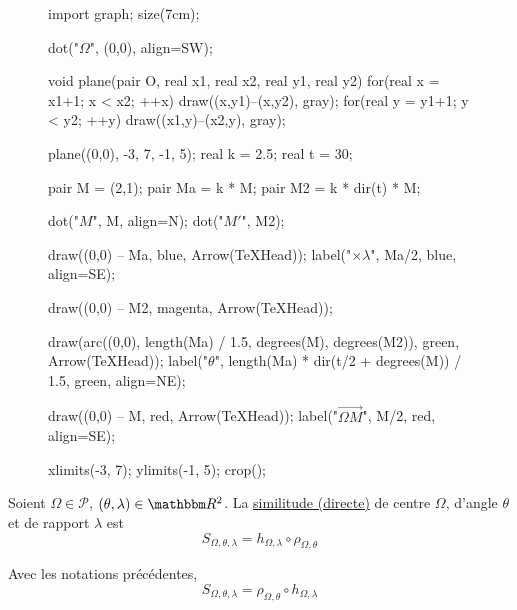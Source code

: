 \begin{defn}
	\begin{minipage}
		{\linewidth}
		\begin{wrapfigure}[10]{r}
			{0.5\linewidth}
			\centering
			\begin{asy}
				import graph;
				size(7cm);

				dot("$\Omega$", (0,0), align=SW);

				void plane(pair O, real x1, real x2, real y1, real y2) {
					for(real x = x1+1; x < x2; ++x) draw((x,y1)--(x,y2), gray);
					for(real y = y1+1; y < y2; ++y) draw((x1,y)--(x2,y), gray);
				}

				plane((0,0), -3, 7, -1, 5);
				real k = 2.5;
				real t = 30;

				pair M = (2,1);
				pair Ma = k * M;
				pair M2 = k * dir(t) * M;

				dot("$M$", M, align=N);
				dot("$M'$", M2);

				draw((0,0) -- Ma, blue, Arrow(TeXHead));
				label("$\times\lambda$", Ma/2, blue, align=SE);

				draw((0,0) -- M2, magenta, Arrow(TeXHead));

				draw(arc((0,0), length(Ma) / 1.5, degrees(M), degrees(M2)), green, Arrow(TeXHead));
				label("$\theta$", length(Ma) * dir(t/2 + degrees(M)) / 1.5, green, align=NE);

				draw((0,0) -- M, red, Arrow(TeXHead));
				label("$\vec{\Omega M}$", M/2, red, align=SE);

				xlimits(-3, 7);
				ylimits(-1, 5);
				crop();
			\end{asy}
		\end{wrapfigure}

		Soient $\Omega\in \mathcal{P}$, $(\theta,\lambda)\in \R^2$.
		La \underline{similitude (directe)} de centre $\Omega$, d'angle $\theta$ et de rapport $\lambda$ est \[
			S_{\Omega,\theta,\lambda} = h_{\Omega,\lambda} \circ \rho_{\Omega, \theta}
		\] 
	\end{minipage}
\end{defn}

\begin{prop}
	\begin{minipage}
		{0.5\linewidth}
		Avec les notations précédentes, \[
			S_{\Omega,\theta,\lambda} = \rho_{\Omega, \theta} \circ h_{\Omega,\lambda}
		\] 
	\end{minipage}
\end{prop}

